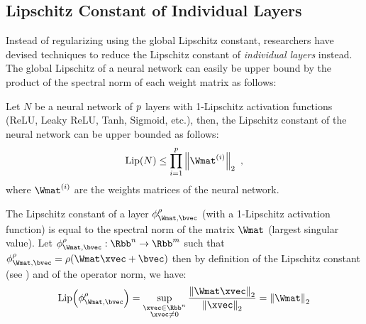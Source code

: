 \subsection{Lipschitz Constant of Individual Layers}
\label{subsection:ch3-lipschitz_constant_of_individual_layers}

\noindent
Instead of regularizing using the global Lipschitz constant, researchers have devised techniques to reduce the Lipschitz constant of \emph{individual layers} instead. 
The global Lipschitz of a neural network can easily be upper bound by the product of the spectral norm of each weight matrix as follows:
\begin{proposition} \label{proposition:ch3-naive_upper_bound_lipschitz}
  Let $N$ be a neural network of $p$ layers with 1-Lipschitz activation functions (\eg ReLU,
  Leaky ReLU, Tanh, Sigmoid, etc.), then, the Lipschitz constant of the neural network can be upper bounded as follows:
  \begin{equation} \label{equation:ch3-naive_upper_bound_lipschitz}
    \lip{N} \leq \prod_{i=1}^\depth \norm{\Wmat^{(i)}}_2 \enspace,
  \end{equation}
  where $\Wmat^{(i)}$ are the weights matrices of the neural network.
\end{proposition}

\begin{remark}
  The Lipschitz constant of a layer $\layer_{\Wmat, \bvec}^\rho$ (with a 1-Lipschitz activation function) is equal to the spectral norm of the matrix $\Wmat$ (largest singular value).
  Let $\layer_{\Wmat, \bvec}^\rho: \Rbb^n \rightarrow \Rbb^m$ such that $\layer_{\Wmat, \bvec}^\rho = \rho(\Wmat \xvec + \bvec)$ then by definition of the Lipschitz constant (see ) and of the operator norm, we have:
  \begin{equation}
    \lip{\layer_{\Wmat, \bvec}^\rho} = \sup_{\substack{\xvec \in \Rbb^n \\ \xvec \neq 0}} \frac{\norm{\Wmat \xvec}_2}{\norm{\xvec}_2} = \norm{\Wmat}_2
  \end{equation}
  \removespace
\end{remark}

